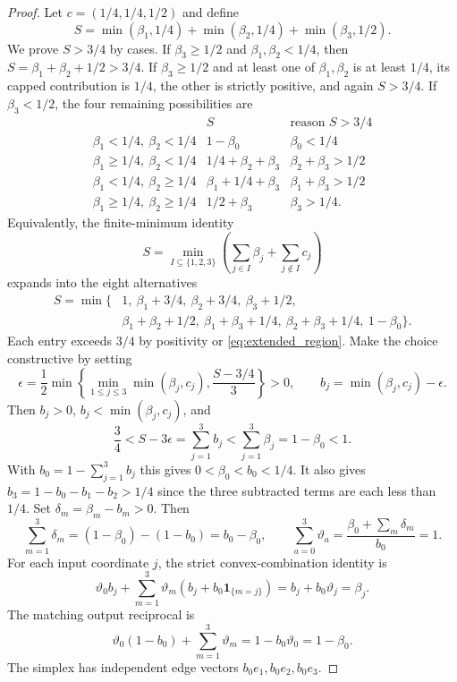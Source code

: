 \documentclass[12pt,reqno]{amsart}
\theoremstyle{plain}
\theoremstyle{definition}
\theoremstyle{remark}
\numberwithin{equation}{section}
\newcommand{\one}{\mathbf 1}
\begin{document}
\begin{proof}
Let $c=(1/4,1/4,1/2)$ and define
\begin{equation}\label{eq:capped_sum}
 S=\min(\beta_1,1/4)+\min(\beta_2,1/4)+\min(\beta_3,1/2).
\end{equation}
We prove $S>3/4$ by cases. If
$\beta_3\ge1/2$ and $\beta_1,\beta_2<1/4$, then
$S=\beta_1+\beta_2+1/2>3/4$. If $\beta_3\ge1/2$ and at
least one of $\beta_1,\beta_2$ is at least $1/4$, its capped
contribution is $1/4$, the other is strictly positive, and again
$S>3/4$. If $\beta_3<1/2$, the four remaining possibilities are
\[
 \begin{array}{c|c|c}
 &S&\text{reason }S>3/4\\ \hline
 \beta_1<1/4,\ \beta_2<1/4
    &1-\beta_0&\beta_0<1/4\\
 \beta_1\ge1/4,\ \beta_2<1/4
    &1/4+\beta_2+\beta_3&\beta_2+\beta_3>1/2\\
 \beta_1<1/4,\ \beta_2\ge1/4
    &\beta_1+1/4+\beta_3&\beta_1+\beta_3>1/2\\
 \beta_1\ge1/4,\ \beta_2\ge1/4
    &1/2+\beta_3&\beta_3>1/4.
 \end{array}
\]
Equivalently, the finite-minimum identity
\[
 S=\min_{I\subseteq\{1,2,3\}}
       \left(\sum_{j\in I}\beta_j+\sum_{j\notin I}c_j\right)
 \]
expands into the eight alternatives
\begin{align*}
 S=\min\{&1,\ \beta_1+3/4,\ \beta_2+3/4,\ \beta_3+1/2,\\
         &\beta_1+\beta_2+1/2,\ \beta_1+\beta_3+1/4,
            \ \beta_2+\beta_3+1/4,\ 1-\beta_0\}.
\end{align*}
Each entry exceeds $3/4$ by positivity or
\eqref{eq:extended_region}.
Make the choice constructive by setting
\[
 \epsilon=\frac12\min\left\{
                  \min_{1\le j\le3}\min(\beta_j,c_j),
                              \frac{S-3/4}{3}\right\}>0,
 \qquad b_j=\min(\beta_j,c_j)-\epsilon.
\]
Then $b_j>0$, $b_j<\min(\beta_j,c_j)$, and
\[
 \frac34<S-3\epsilon=\sum_{j=1}^3b_j
           <\sum_{j=1}^3\beta_j=1-\beta_0<1.
\]
With $b_0=1-\sum_{j=1}^3b_j$ this gives
$0<\beta_0<b_0<1/4$. It also gives
$b_3=1-b_0-b_1-b_2>1/4$ since the three subtracted terms are
each less than $1/4$.
Set $\delta_m=\beta_m-b_m>0$. Then
\[
 \sum_{m=1}^3\delta_m
 =(1-\beta_0)-(1-b_0)=b_0-\beta_0,
 \qquad\sum_{a=0}^3\vartheta_a
 =\frac{\beta_0+\sum_m\delta_m}{b_0}=1.
\]
For each input coordinate $j$, the strict convex-combination identity is
\[
 \vartheta_0b_j+\sum_{m=1}^3\vartheta_m
                  (b_j+b_0\one_{\{m=j\}})
 =b_j+b_0\vartheta_j=\beta_j.
\]
The matching output reciprocal is
\[
 \vartheta_0(1-b_0)+\sum_{m=1}^3\vartheta_m
 =1-b_0\vartheta_0=1-\beta_0.
\]
The simplex has independent edge vectors $b_0e_1,b_0e_2,b_0e_3$.
\end{proof}
\end{document}
